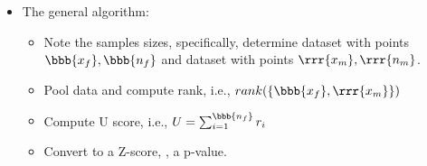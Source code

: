 \begin{itemize}
\begin{itemize}
        \begin{itemize}
          \item The general algorithm:
            \begin{itemize}
              \item Note the samples sizes, specifically, determine dataset with  points \(\bbb{x_f}, \bbb{n_f}\) and dataset with  points \(\rrr{x_m}, \rrr{n_m}\).
              \item Pool data and compute rank, i.e., \(rank(\{\bbb{x_f},\rrr{x_m}\})\)
              \item Compute U score, i.e., \(U = \sum_{i = 1}^{\bbb{n_f}}r_i\)
              \item Convert to a Z-score, \hyperref[Subsection: Degrees of Freedom]{}, a p-value.
            \end{itemize}
        \end{itemize}
  \end{itemize}
  

\end{itemize}
